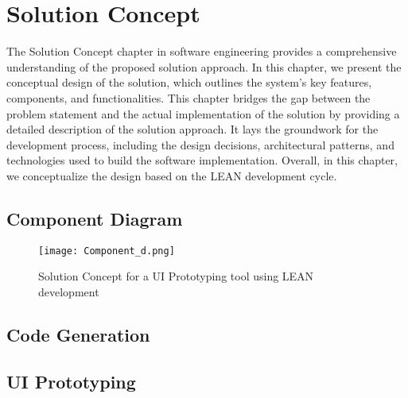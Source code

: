 
\chapter{Solution Concept}

\ifpdf
    \graphicspath{{Chapters/Solution-Concept/Figs/}{Chapters/Solution-Concept/Figs/}{Chapters/Solution-Concept/Figs/}}
\else
    \graphicspath{{Chapters/Solution-Concept/Figs/}{Chapters/Solution-Concept/Figs/}}
\fi
The Solution Concept chapter in software engineering provides a comprehensive understanding of the proposed solution approach. 
In this chapter, we present the conceptual design of the solution, which outlines the system's key features, components, and functionalities. 
This chapter bridges the gap between the problem statement and the actual implementation of the solution by providing a detailed description of the solution approach. 
It lays the groundwork for the development process, including the design decisions, architectural patterns, and technologies used to build the software implementation. 
Overall, in this chapter, we conceptualize the design based on the LEAN development cycle.

\section{Component Diagram}
\label{sc:section:componentD}
\begin{figure}[htbp!]
    \centering    
    \texttt{[image: Component\_d.png]}
    \caption[Copmponent Diagram]{Solution Concept for a UI Prototyping tool using LEAN development}
    \label{fig:sc:componentD}
\end{figure}

\section{Code Generation}
\label{sc:section:codeGeneration}

\section{UI Prototyping}
\label{sc:section:prototyping}

